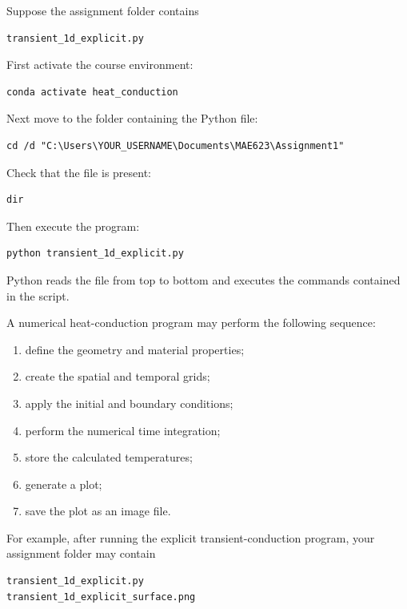 \documentclass[11pt]{article}
\begin{document}
Suppose the assignment folder contains

\begin{lstlisting}
transient_1d_explicit.py
\end{lstlisting}

First activate the course environment:

\begin{lstlisting}
conda activate heat_conduction
\end{lstlisting}

Next move to the folder containing the Python file:

\begin{lstlisting}
cd /d "C:\Users\YOUR_USERNAME\Documents\MAE623\Assignment1"
\end{lstlisting}

Check that the file is present:

\begin{lstlisting}
dir
\end{lstlisting}

Then execute the program:

\begin{lstlisting}
python transient_1d_explicit.py
\end{lstlisting}

Python reads the file from top to bottom and executes the commands
contained in the script.

A numerical heat-conduction program may perform the following sequence:

\begin{enumerate}
    \item define the geometry and material properties;
    \item create the spatial and temporal grids;
    \item apply the initial and boundary conditions;
    \item perform the numerical time integration;
    \item store the calculated temperatures;
    \item generate a plot;
    \item save the plot as an image file.
\end{enumerate}

For example, after running the explicit transient-conduction program,
your assignment folder may contain

\begin{lstlisting}
transient_1d_explicit.py
transient_1d_explicit_surface.png
\end{lstlisting}
\end{document}
